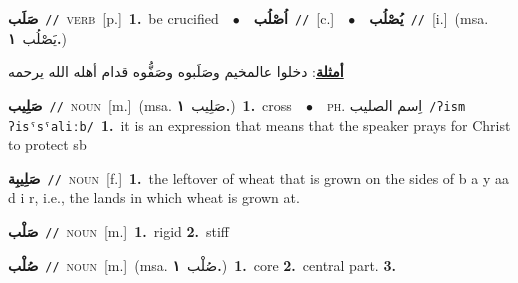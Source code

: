 \documentclass[10pt,a4paper,twoside]{article} %
\begin{document}
\begin{multicols}{2}
{\setlength\topsep{0pt}\textbf{\foreignlanguage{arabic}{صَلَب}}\ {\color{gray}\texttt{//}\color{black}}\ \textsc{verb}\ [p.]\ \textbf{1.}~be crucified\ \ $\bullet$\ \ \setlength\topsep{0pt}\textbf{\foreignlanguage{arabic}{اُصْلُب}}\ {\color{gray}\texttt{//}\color{black}}\ [c.]\ \ $\bullet$\ \ \setlength\topsep{0pt}\textbf{\foreignlanguage{arabic}{يُصْلُب}}\ {\color{gray}\texttt{//}\color{black}}\ [i.]\ \color{gray}(msa. \foreignlanguage{arabic}{يَصْلُب}~\foreignlanguage{arabic}{\textbf{١.}})\color{black}\  \begin{flushright}\color{gray}\foreignlanguage{arabic}{\textbf{\underline{\foreignlanguage{arabic}{أمثلة}}}: دخلوا عالمخيم وصَلَبوه وصَفُّوه قدام أهله الله يرحمه}\end{flushright}\color{black}} \vspace{2mm}

{\setlength\topsep{0pt}\textbf{\foreignlanguage{arabic}{صَلِيب}}\ {\color{gray}\texttt{//}\color{black}}\ \textsc{noun}\ [m.]\ \color{gray}(msa. \foreignlanguage{arabic}{صَلِيب}~\foreignlanguage{arabic}{\textbf{١.}})\color{black}\ \textbf{1.}~cross\ \ $\bullet$\ \ \textsc{ph.} \color{gray} \foreignlanguage{arabic}{اِسم الصليب}\color{black}\ {\color{gray}\texttt{/{\sffamily ʔism ʔisˤsˤaliːb}/}\color{black}}\ \textbf{1.}~it is an expression that means that the speaker prays for Christ to protect sb\ } \vspace{2mm}

{\setlength\topsep{0pt}\textbf{\foreignlanguage{arabic}{صَلِيبِة}}\ {\color{gray}\texttt{//}\color{black}}\ \textsc{noun}\ [f.]\ \textbf{1.}~the leftover of wheat that is grown on the sides of b a y aa d i r, i.e., the lands in which wheat is grown at.\ } \vspace{2mm}

{\setlength\topsep{0pt}\textbf{\foreignlanguage{arabic}{صَلْب}}\ {\color{gray}\texttt{//}\color{black}}\ \textsc{noun}\ [m.]\ \textbf{1.}~rigid  \textbf{2.}~stiff\ } \vspace{2mm}

{\setlength\topsep{0pt}\textbf{\foreignlanguage{arabic}{صُلْب}}\ {\color{gray}\texttt{//}\color{black}}\ \textsc{noun}\ [m.]\ \color{gray}(msa. \foreignlanguage{arabic}{صُلْب}~\foreignlanguage{arabic}{\textbf{١.}})\color{black}\ \textbf{1.}~core  \textbf{2.}~central part.  \textbf{3.}~\ } \vspace{2mm}


\end{multicols}
\end{document}
